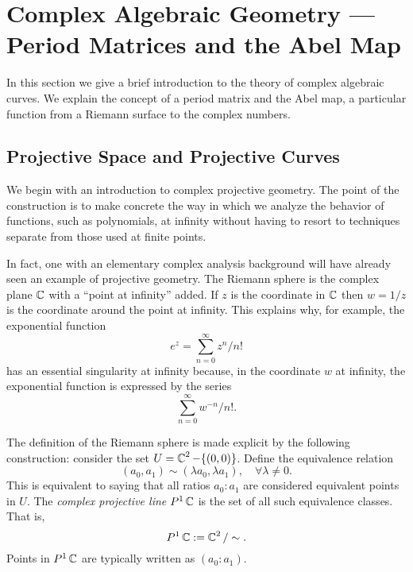 \section{Complex Algebraic Geometry --- Period Matrices and the Abel Map}

In this section we give a brief introduction to the theory of complex
algebraic curves. We explain the concept of a period matrix and the Abel
map, a particular function from a Riemann surface to the complex
numbers.

\subsection{Projective Space and Projective Curves}

We begin with an introduction to complex projective geometry. The point
of the construction is to make concrete the way in which we analyze the
behavior of functions, such as polynomials, at infinity without having
to resort to techniques separate from those used at finite points.

In fact, one with an elementary complex analysis background will have
already seen an example of projective geometry. The Riemann sphere is
the complex plane $\operatorname{\mathbb{C}}$ with a ``point at infinity'' added. If $z$ is
the coordinate in $\operatorname{\mathbb{C}}$ then $w = 1/z$ is the coordinate around the
point at infinity. This explains why, for example, the exponential
function
\[
    e^z = \sum_{n=0}^\infty z^n / n!
\]
has an essential singularity at infinity because, in the coordinate $w$
at infinity, the exponential function is expressed by the series
\[
    \sum_{n=0}^\infty w^{-n} / n!.
\]

The definition of the Riemann sphere is made explicit by the following
construction: consider the set $U = \operatorname{\mathbb{C}}^2 - \{(0,0)\}$. Define the
equivalence relation
\[
    (a_0, a_1) \sim (\lambda a_0, \lambda a_1),
    \quad \forall \lambda \neq 0.
\]
This is equivalent to saying that all ratios $a_0 : a_1$ are considered
equivalent points in $U$. The {\it complex projective line} $P^1\operatorname{\mathbb{C}}$ is
the set of all such equivalence classes. That is,
\[
    P^1\operatorname{\mathbb{C}} := \operatorname{\mathbb{C}}^2 / \sim.
\]
Points in $P^1\operatorname{\mathbb{C}}$ are typically written as $(a_0 : a_1)$.

